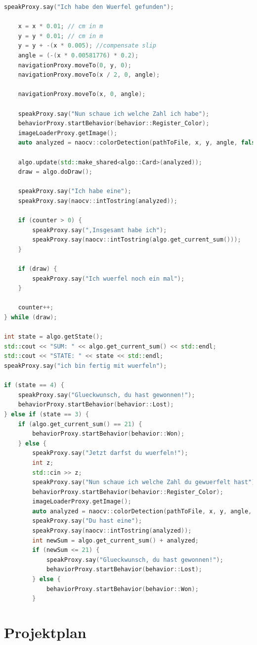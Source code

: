 \begin{appendix}
\begin{lstlisting}[language=c++,
                   caption={Mainloop},
                   label={lst:main1}]
    speakProxy.say("Ich habe den Wuerfel gefunden");

    x = x * 0.01; // cm in m
    y = y * 0.01; // cm in m
    y = y + -(x * 0.005); //compensate slip
    angle = (-(x * 0.00581776) * 0.2);
    navigationProxy.moveTo(0, y, 0);
    navigationProxy.moveTo(x / 2, 0, angle);

    navigationProxy.moveTo(x, 0, angle);

    speakProxy.say("Nun schaue ich welche Zahl ich habe");
    behaviorProxy.startBehavior(behavior::Register_Color);
    imageLoaderProxy.getImage();
    auto analyzed = naocv::colorDetection(pathToFile, x, y, angle, false);

    algo.update(std::make_shared<algo::Card>(analyzed));
    draw = algo.doDraw();

    speakProxy.say("Ich habe eine");
    speakProxy.say(naocv::intTostring(analyzed));

    if (counter > 0) {
        speakProxy.say(",Insgesamt habe ich");
        speakProxy.say(naocv::intTostring(algo.get_current_sum()));
    }

    if (draw) {
        speakProxy.say("Ich wuerfel noch ein mal");
    }

    counter++;
} while (draw);

int state = algo.getState();
std::cout << "SUM: " << algo.get_current_sum() << std::endl;
std::cout << "STATE: " << state << std::endl;
speakProxy.say("ich bin fertig mit wuerfeln");

if (state == 4) {
    speakProxy.say("Glueckwunsch, du hast gewonnen!");
    behaviorProxy.startBehavior(behavior::Lost);
} else if (state == 3) {
    if (algo.get_current_sum() == 21) {
        behaviorProxy.startBehavior(behavior::Won);
    } else {
        speakProxy.say("Jetzt darfst du wuerfeln!");
        int z;
        std::cin >> z;
        speakProxy.say("Nun schaue ich welche Zahl du gewuerfelt hast");
        behaviorProxy.startBehavior(behavior::Register_Color);
        imageLoaderProxy.getImage();
        auto analyzed = naocv::colorDetection(pathToFile, x, y, angle, false);
        speakProxy.say("Du hast eine");
        speakProxy.say(naocv::intTostring(analyzed));
        int newSum = algo.get_current_sum() + analyzed;
        if (newSum <= 21) {
            speakProxy.say("Glueckwunsch, du hast gewonnen!");
            behaviorProxy.startBehavior(behavior::Lost);
        } else {
            behaviorProxy.startBehavior(behavior::Won);
        }
\end{lstlisting}

    \chapter{Projektplan}

    
        \label{apx:projektplan}


\end{appendix}
